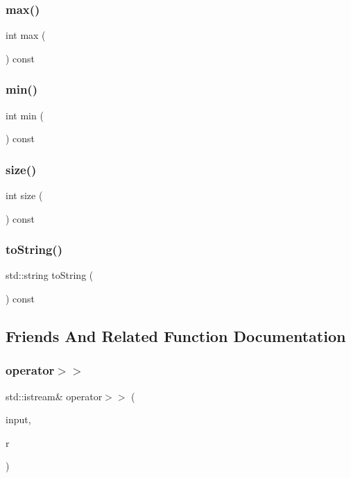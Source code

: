\subsubsection{\texorpdfstring{max()}{max()}}
{\footnotesize\ttfamily int max (\begin{DoxyParamCaption}{ }\end{DoxyParamCaption}) const}

\mbox{\label{classIntRange_a4ec1ccea7eddbc7355ba5d00afcaec2d}} 
\subsubsection{\texorpdfstring{min()}{min()}}
{\footnotesize\ttfamily int min (\begin{DoxyParamCaption}{ }\end{DoxyParamCaption}) const}

\mbox{\label{classIntRange_af9593d4a5ff4274efaf429cb4f9e57cc}} 
\subsubsection{\texorpdfstring{size()}{size()}}
{\footnotesize\ttfamily int size (\begin{DoxyParamCaption}{ }\end{DoxyParamCaption}) const}

\mbox{\label{classIntRange_a1fe5121d6528fdea3f243321b3fa3a49}} 
\subsubsection{\texorpdfstring{to\+String()}{toString()}}
{\footnotesize\ttfamily std\+::string to\+String (\begin{DoxyParamCaption}{ }\end{DoxyParamCaption}) const}



\subsection{Friends And Related Function Documentation}
\mbox{\label{classIntRange_a4b452901f18832cc506afd0f320e5934}} 
\subsubsection{\texorpdfstring{operator$>$$>$}{operator>>}}
{\footnotesize\ttfamily std\+::istream\& operator$>$$>$ (\begin{DoxyParamCaption}\item[{std\+::istream \&}]{input,  }\item[{\mbox{\hyperlink{classIntRange}{Int\+Range}} \&}]{r }\end{DoxyParamCaption})\hspace{0.3cm}{\ttfamily [friend]}}

